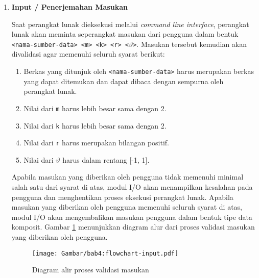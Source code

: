 \begin{enumerate}
    \item \textbf{Input / Penerjemahan Masukan}
    
    Saat perangkat lunak dieksekusi melalui \textit{command line interface}, perangkat lunak akan meminta seperangkat masukan dari pengguna dalam bentuk \texttt{<nama-sumber-data> <m> <k> <r> <$\vartheta$>}. Masukan tersebut kemudian akan divalidasi agar memenuhi seluruh syarat berikut:
    
    \begin{enumerate}
        \item Berkas yang ditunjuk oleh \texttt{<nama-sumber-data>} harus merupakan berkas yang dapat ditemukan dan dapat dibaca dengan sempurna oleh perangkat lunak.
        \item Nilai dari \texttt{m} harus lebih besar sama dengan 2.
        \item Nilai dari \texttt{k} harus lebih besar sama dengan 2.
        \item Nilai dari \texttt{r} harus merupakan bilangan positif.
        \item Nilai dari $\vartheta$ harus dalam rentang [-1, 1].
    \end{enumerate}
    
    Apabila masukan yang diberikan oleh pengguna tidak memenuhi minimal salah satu dari syarat di atas, modul I/O akan menampilkan kesalahan pada pengguna dan menghentikan proses eksekusi perangkat lunak. Apabila masukan yang diberikan oleh pengguna memenuhi seluruh syarat di atas, modul I/O akan mengembalikan masukan pengguna dalam bentuk tipe data komposit. Gambar \ref{bab4:flowchart-input} menunjukkan diagram alur dari proses validasi masukan yang diberikan oleh pengguna.
    
    \iffalse
    
    Untuk mempermudah proses implementasi perangkat lunak, fungsionalitas ini akan diimplementasikan menggunakan bantuan pustaka C++ yang bernama \texttt{argparse}. Pustaka \texttt{argparse} dipilih karena memiliki kemampuan untuk mempermudah konversi tipe data menjadi tipe data yang sesuai serta menyediakan fitur untuk menampilkan bantuan penggunaan perangkat lunak dalam bentuk \textit{command line interface} pada pengguna.
    
    \fi
    
    \begin{figure}[t]
        \centering
        \texttt{[image: Gambar/bab4:flowchart-input.pdf]}
        \caption{Diagram alir proses validasi masukan}
        \label{bab4:flowchart-input}
    \end{figure}
    

\end{enumerate}
